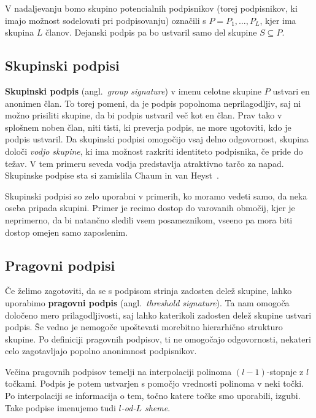 \documentclass[isrm2, tisk]{fmfdelo}
\begin{document}
V nadaljevanju bomo skupino potencialnih podpisnikov (torej podpisnikov, ki imajo možnost sodelovati pri 
podpisovanju) označili s $P = P_1, \dots, P_L$, kjer ima skupina $L$ članov. Dejanski podpis pa bo 
ustvaril samo del skupine $S \subseteq P$.

\subsection{Skupinski podpisi}
\textbf{Skupinski podpis} (angl.\ \textit{group signature}) v imenu celotne skupine $P$ ustvari en 
anonimen član. To torej pomeni, da je podpis popolnoma neprilagodljiv, saj ni možno prisiliti skupine,
da bi podpis ustvaril več kot en član. Prav tako v splošnem noben član, niti tisti, ki preverja podpis,
ne more ugotoviti, kdo je podpis ustvaril. Da skupinski podpisi omogočijo vsaj delno odgovornost, 
skupina določi \textit{vodjo skupine}, ki ima možnost razkriti identiteto podpisnika, če pride do 
težav. V tem primeru seveda vodja predstavlja atraktivno tarčo za napad. Skupinske podpise sta si
zamislila Chaum in van Heyst~\cite{chaum1991group}.

\begin{primer}
    Skupinski podpisi so zelo uporabni v primerih, ko moramo vedeti samo, da neka oseba pripada skupini.
    Primer je recimo dostop do varovanih območij, kjer je neprimerno, da bi natančno sledili vsem
    posameznikom, vseeno pa mora biti dostop omejen samo zaposlenim.
\end{primer}

\subsection{Pragovni podpisi}
Če želimo zagotoviti, da se s podpisom strinja zadosten delež skupine, lahko uporabimo \textbf{pragovni 
podpis} (angl.\ \textit{threshold signature}). Ta nam omogoča določeno mero prilagodljivosti, saj lahko 
katerikoli zadosten delež skupine ustvari podpis. Še vedno je nemogoče upoštevati morebitno hierarhično
strukturo skupine. Po definiciji pragovnih podpisov, ti ne omogočajo odgovornosti, nekateri celo
zagotavljajo popolno anonimnost podpisnikov.

Večina pragovnih podpisov temelji na interpolaciji polinoma $(l - 1)$-stopnje z $l$ točkami. Podpis je 
potem ustvarjen s pomočjo vrednosti polinoma v neki točki. Po interpolaciji se informacija o tem, točno 
katere točke smo uporabili, izgubi. Take podpise imenujemo tudi \textit{$l$-od-$L$ sheme}.
\end{document}
